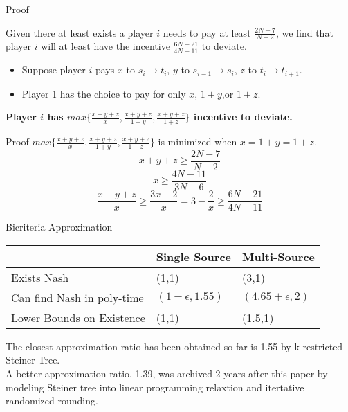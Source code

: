 \documentclass[11pt,aspectratio=169]{beamer}
\begin{document}
\begin{frame}{Proof}
    \begin{lemma}
        Given there at least exists a player $i$ needs to pay at least $\frac{2N-7}{N-2}$, we find that player $i$ will at least have the incentive $\frac{6N-21}{4N-11}$ to deviate.
    \end{lemma}
    \begin{itemize}
        \item Suppose player $i$ pays $x$ to $s_i \rightarrow t_i$, $y$ to $s_{i-1} \rightarrow s_i$, $z$ to $t_i \rightarrow t_{i+1}$. 
        \item Player 1 has the choice to pay for only $x$, $1+y$,or $1+z$. 
    \end{itemize}
    \vspace{15pt}
    \textbf{ Player $i$ has $max\{\frac{x+y+z}{x},\frac{x+y+z}{1+y},\frac{x+y+z}{1+z}\}$ incentive to deviate. }
\end{frame}
\begin{frame}{Proof}
    $max\{\frac{x+y+z}{x},\frac{x+y+z}{1+y},\frac{x+y+z}{1+z}\}$ is minimized when $x = 1+y =1+z$. 
    \[x+y+z \geq \frac{2N-7}{N-2}\]
    \[x \geq \frac{4N-11}{3N-6}\]
    \[\frac{x+y+z}{x} \geq \frac{3x-2}{x} = 3-\frac{2}{x} \geq \frac{6N-21}{4N-11} \]
\end{frame}

\begin{frame}{Bicriteria Approximation}
    \begin{center}
        \begin{tabular} { 
            | m{5cm} | m{3cm}| m{3cm} | }
           \hline
            & Single Source & Multi-Source\\
           \hline
           Exists Nash  & (1,1)  &  (3,1)\\
          \hline
          Can find Nash in poly-time & $(1+\epsilon,1.55)$ & $(4.65+\epsilon,2)$\\
          \hline
          Lower Bounds on Existence & (1,1) & (1.5,1)\\
          \hline
          \end{tabular}
    \end{center}
      \vspace{10pt}
    The closest approximation ratio has been obtained so far is 1.55 by k-restricted Steiner Tree.\\
    A better approximation ratio, 1.39, was archived 2 years after this paper by modeling Steiner tree into linear programming relaxtion and itertative randomized rounding.
\end{frame}
\end{document}
